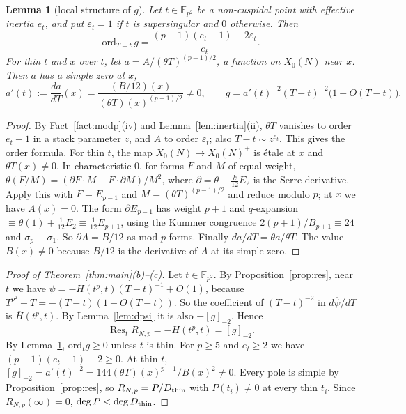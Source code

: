 \documentclass[11pt,a4paper]{article}
\numberwithin{equation}{section}
\newtheorem{lemma}[theorem]{Lemma}
\theoremstyle{definition}
\theoremstyle{remark}
\newcommand{\Fq}{\mathbb F_{p^2}}
\newcommand{\Res}{\operatorname{Res}}
\begin{document}
\begin{lemma}[local structure of $g$]\label{lem:g}
Let $t\in\Fq$ be a non-cuspidal point with effective inertia $e_t$, and put $\varepsilon_t=1$ if
$t$ is supersingular and $0$ otherwise. Then
\[
\mathrm{ord}_{T=t}\,g=\frac{(p-1)(e_t-1)-2\varepsilon_t}{e_t}.
\]
For thin $t$ and $x$ over $t$, let $a=A/(\theta T)^{(p-1)/2}$, a function on $X_0(N)$ near $x$.
Then $a$ has a simple zero at $x$,
\[
a'(t):=\frac{da}{dT}(x)=\frac{(B/12)(x)}{(\theta T)(x)^{(p+1)/2}}\ne0,
\qquad g=a'(t)^{-2}(T-t)^{-2}\bigl(1+O(T-t)\bigr).
\]
\end{lemma}
\begin{proof}
By Fact~\ref{fact:modp}(iv) and Lemma~\ref{lem:inertia}(ii), $\theta T$ vanishes to order $e_t-1$ in a
stack parameter $z$, and $A$ to order $\varepsilon_t$; also $T-t\sim z^{e_t}$. This gives the order formula.
For thin $t$, the map $X_0(N)\to X_0(N)^+$ is \'etale at $x$ and $\theta T(x)\ne0$. In
characteristic $0$, for forms $F$ and $M$ of equal weight,
$\theta(F/M)=(\partial F\cdot M-F\cdot\partial M)/M^2$, where $\partial=\theta-\frac{k}{12}E_2$ is the
Serre derivative. Apply this with $F=E_{p-1}$ and $M=(\theta T)^{(p-1)/2}$ and reduce modulo $p$; at
$x$ we have $A(x)=0$. The form $\partial E_{p-1}$ has weight $p+1$ and $q$-expansion
$\equiv\theta(1)+\frac1{12}E_2\equiv\frac1{12}E_{p+1}$, using the Kummer congruence
$2(p+1)/B_{p+1}\equiv24$ and $\sigma_p\equiv\sigma_1$. So $\partial A=B/12$ as mod-$p$ forms. Finally
$da/dT=\theta a/\theta T$. The value $B(x)\ne0$ because $B/12$ is the derivative of $A$ at its simple zero.
\end{proof}

\begin{proof}[Proof of Theorem~\ref{thm:main}(b)--(c)]
Let $t\in\Fq$. By Proposition~\ref{prop:res}, near $t$ we have
$\overline\psi=-\overline H(t^p,t)(T-t)^{-1}+O(1)$, because $T^{p^2}-T=-(T-t)(1+O(T-t))$. So the
coefficient of $(T-t)^{-2}$ in $d\overline\psi/dT$ is $\overline H(t^p,t)$. By Lemma~\ref{lem:dpsi}
it is also $-[g]_{-2}$. Hence
\[
\Res_tR_{N,p}=-\overline H(t^p,t)=[g]_{-2}.
\]
By Lemma~\ref{lem:g}, $\mathrm{ord}_tg\ge0$ unless $t$ is thin. For $p\ge5$ and $e_t\ge2$ we have
$(p-1)(e_t-1)-2\ge0$. At thin $t$, $[g]_{-2}=a'(t)^{-2}=144(\theta T)(x)^{p+1}/B(x)^2\ne0$. Every pole is
simple by Proposition~\ref{prop:res}, so $R_{N,p}=P/D_{\rm thin}$ with $P(t_i)\ne0$ at every thin
$t_i$. Since $R_{N,p}(\infty)=0$, $\deg P<\deg D_{\rm thin}$.
\end{proof}
\end{document}
